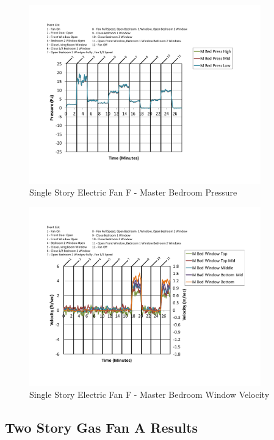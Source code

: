 \documentclass{article}
\begin{document}
\begin{appendices}
	\begin{figure}[H]
		\centering
		\includegraphics[height=3.05in,trim=0.67in 1.1in 0.67in 0.8in,clip=true]{0_Images/Results_Charts/ColdFlow/Single_Story/Electric/F/Master_Bedroom_Pressure.pdf}
		\caption{Single Story Electric Fan F - Master Bedroom Pressure}
	\end{figure}
 

	\begin{figure}[H]
		\centering
		\includegraphics[height=3.05in,trim=0.67in 1.1in 0.67in 0.8in,clip=true]{0_Images/Results_Charts/ColdFlow/Single_Story/Electric/F/Master_Bedroom_Window_Velocity.pdf}
		\caption{Single Story Electric Fan F - Master Bedroom Window Velocity}
	\end{figure}
 
	\clearpage

		\clearpage
\clearpage		\large
\subsection{Two Story Gas Fan A Results} \label{App:Two_StoryGasFanAResults} 


\end{appendices}
\end{document}
